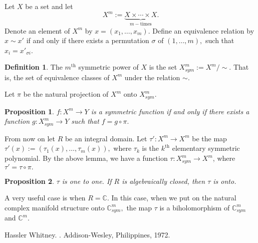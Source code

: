 \documentclass[12pt]{article}
\theoremstyle{theorem}
\newtheorem*{prop}{Proposition}
\theoremstyle{definition}
\newtheorem*{defn}{Definition}
\theoremstyle{remark}
\begin{document}
Let $X$ be a set and let 
\begin{equation*}
X^m := \underbrace{X \times \cdots \times X}_{m-\text{times}} .
\end{equation*}
Denote an element of $X^m$ by $x = (x_1,\ldots,x_m).$
 Define an equivalence relation
by $x \sim x'$ if and only if there exists a 
permutation $\sigma$ of $(1,\ldots,m),$ such that
$x_i = x'_{\sigma{i}}$.

\begin{defn}
The $m^{\text{th}}$ symmetric power of $X$ is
the set $X^m_{sym} := X^m / \sim.$  That is, the set of equivalence classes of $X^m$ under the
relation $\sim.$
\end{defn}

Let $\pi$ be the natural projection of $X^m$ onto $X^m_{sym}$.

\begin{prop}
$f \colon X^m \to Y$ is a symmetric function if and only if there exists a function
$g \colon X^m_{sym} \to Y$ such that $f = g \circ \pi.$
\end{prop}

From now on let $R$ be an integral domain.  Let $\tau' \colon X^m \to X^m$ be the map
$\tau'(x) := (\tau_1(x),\ldots,\tau_m(x)),$ where $\tau_k$ is the $k^\text{th}$ elementary symmetric
polynomial.  By the above lemma, we have a function $\tau \colon X^m_{sym} \to X^m$, where
$\tau' = \tau \circ \pi .$

\begin{prop}
$\tau$ is one to one.  If $R$ is algebraically closed, then $\tau$ is onto.
\end{prop}


A very useful case is when $R = \mathbb{C}.$  In this case, when we put on the natural complex manifold structure
onto ${\mathbb{C}}^m_{sym},$ the map $\tau$ is a biholomorphism of ${\mathbb{C}}^m_{sym}$ and
${\mathbb{C}}^m .$

\begin{thebibliography}{9}
Hassler Whitney.
{\em {}}.
Addison-Wesley, Philippines, 1972.
\end{thebibliography}
\end{document}
